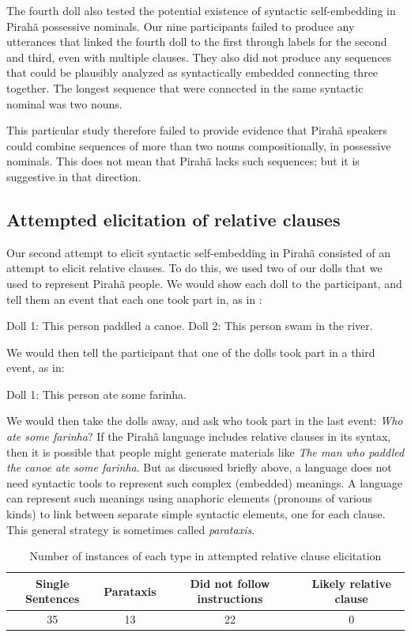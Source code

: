 \documentclass{article}
\begin{document}
The fourth doll also tested the potential existence of syntactic self-embedding in Pirahã possessive nominals. Our nine participants failed to produce any utterances that linked the fourth doll to the first through labels for the second and third, even with multiple clauses.  They also did not produce any sequences that could be plausibly analyzed as syntactically embedded connecting three together. The longest sequence that were connected in the same syntactic nominal was two nouns.

This particular study therefore failed to provide evidence that Pirahã speakers could combine sequences of more than two nouns compositionally, in possessive nominals.  This does not mean that Pirahã lacks such sequences; but it is suggestive in that direction.

\subsection{Attempted elicitation of relative clauses}

Our second attempt to elicit syntactic self-embedding in Pirahã consisted of an attempt to elicit relative clauses.  To do this, we used two of our dolls that we used to represent Pirahã people. We would show each doll to the participant, and tell them an event that each one took part in, as in :

\eal
\label{piraha_rcs}
\ex \label{piraha_rcs1} Doll 1: This person paddled a canoe.
\ex \label{piraha_rcs2} Doll 2: This person swam in the river.
\zl

We would then tell the participant that one of the dolls took part in a third event, as in:

\ea
\label{piraha_rcs3}
Doll 1: This person ate some farinha.
\z

We would then take the dolls away, and ask who took part in the last event: \textit{Who ate some farinha}?  If the Pirahã language includes relative clauses in its syntax, then it is possible that people might generate materials like \textit{The man who paddled the canoe ate some farinha}. But as discussed briefly above, a language does not need syntactic tools to represent such complex (embedded) meanings.  A language can represent such meanings using anaphoric elements (pronouns of various kinds) to link between separate simple syntactic elements, one for each clause.  This general strategy is sometimes called \textit{parataxis}.


\begin{table}
    \begin{tabular}{c c c c}
         Single Sentences & Parataxis & Did not follow instructions & Likely relative clause  \\
         \hline 
         35 & 13 & 22 & 0 
    \end{tabular}
    \caption{Number of instances of each type in attempted relative clause elicitation}
    \label{table1}
\end{table}
\end{document}
